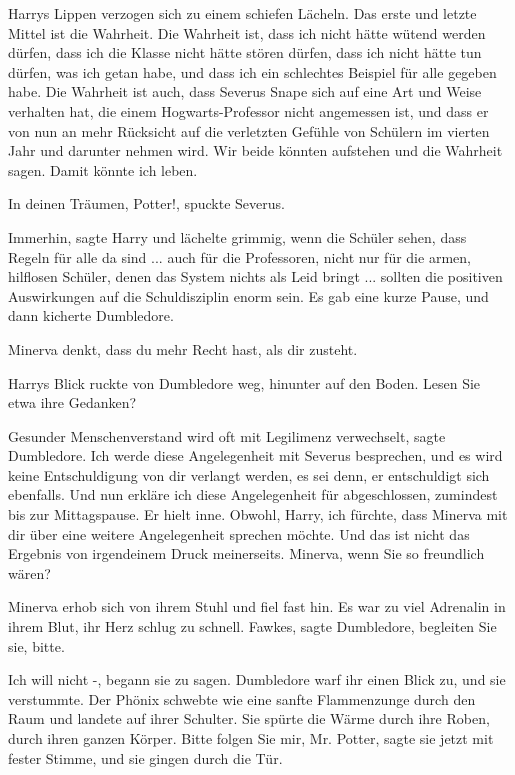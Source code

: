 Harrys Lippen verzogen sich zu einem schiefen Lächeln. \glqq Das erste und
letzte Mittel ist die Wahrheit. Die Wahrheit ist, dass ich nicht hätte wütend
werden dürfen, dass ich die Klasse nicht hätte stören dürfen, dass ich nicht
hätte tun dürfen, was ich getan habe, und dass ich ein schlechtes Beispiel für
alle gegeben habe. Die Wahrheit ist auch, dass Severus Snape sich auf eine Art
und Weise verhalten hat, die einem Hogwarts-Professor nicht angemessen ist, und
dass er von nun an mehr Rücksicht auf die verletzten Gefühle von Schülern im
vierten Jahr und darunter nehmen wird. Wir beide könnten aufstehen und die
Wahrheit sagen. Damit könnte ich leben.\grqq{}

\glqq In deinen Träumen, Potter!\grqq{}, spuckte Severus.

\glqq Immerhin\grqq{}, sagte Harry und lächelte grimmig, \glqq wenn die Schüler
sehen, dass Regeln für alle da sind ... auch für die Professoren, nicht nur für
die armen, hilflosen Schüler, denen das System nichts als Leid bringt ...
sollten die positiven Auswirkungen auf die Schuldisziplin enorm sein.\grqq{} Es
gab eine kurze Pause, und dann kicherte Dumbledore.

\glqq Minerva denkt, dass du mehr Recht hast, als dir zusteht.\grqq{}

Harrys Blick ruckte von Dumbledore weg, hinunter auf den Boden. \glqq Lesen Sie
etwa ihre Gedanken?\grqq{}

\glqq Gesunder Menschenverstand wird oft mit Legilimenz verwechselt\grqq{},
sagte Dumbledore. \glqq Ich werde diese Angelegenheit mit Severus besprechen,
und es wird keine Entschuldigung von dir verlangt werden, es sei denn, er
entschuldigt sich ebenfalls. Und nun erkläre ich diese Angelegenheit für
abgeschlossen, zumindest bis zur Mittagspause.\grqq{} Er hielt inne. \glqq
Obwohl, Harry, ich fürchte, dass Minerva mit dir über eine weitere Angelegenheit
sprechen möchte. Und das ist nicht das Ergebnis von irgendeinem Druck
meinerseits. Minerva, wenn Sie so freundlich wären?\grqq{}

Minerva erhob sich von ihrem Stuhl und fiel fast hin. Es war zu viel Adrenalin
in ihrem Blut, ihr Herz schlug zu schnell. \glqq Fawkes\grqq{}, sagte
Dumbledore, \glqq begleiten Sie sie, bitte.\grqq{}

\glqq Ich will nicht -\grqq{}, begann sie zu sagen. Dumbledore warf ihr einen
Blick zu, und sie verstummte. Der Phönix schwebte wie eine sanfte Flammenzunge
durch den Raum und landete auf ihrer Schulter. Sie spürte die Wärme durch ihre
Roben, durch ihren ganzen Körper. \glqq Bitte folgen Sie mir, Mr. Potter\grqq{},
sagte sie jetzt mit fester Stimme, und sie gingen durch die Tür.


